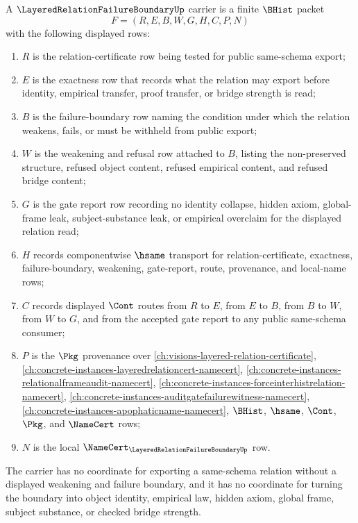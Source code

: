 \begin{definition}
\label{def:layered-relation-failure-boundary-carrier}
A $\LayeredRelationFailureBoundaryUp$ carrier is a finite $\BHist$ packet
$$
F=(R,E,B,W,G,H,C,P,N)
$$
with the following displayed rows:
\begin{enumerate}
\item $R$ is the relation-certificate row being tested for public same-schema export;
\item $E$ is the exactness row that records what the relation may export before identity, empirical transfer, proof transfer, or bridge strength is read;
\item $B$ is the failure-boundary row naming the condition under which the relation weakens, fails, or must be withheld from public export;
\item $W$ is the weakening and refusal row attached to $B$, listing the non-preserved structure, refused object content, refused empirical content, and refused bridge content;
\item $G$ is the gate report row recording no identity collapse, hidden axiom, global-frame leak, subject-substance leak, or empirical overclaim for the displayed relation read;
\item $H$ records componentwise $\hsame$ transport for relation-certificate, exactness, failure-boundary, weakening, gate-report, route, provenance, and local-name rows;
\item $C$ records displayed $\Cont$ routes from $R$ to $E$, from $E$ to $B$, from $B$ to $W$, from $W$ to $G$, and from the accepted gate report to any public same-schema consumer;
\item $P$ is the $\Pkg$ provenance over \autoref{ch:visions-layered-relation-certificate}, \autoref{ch:concrete-instances-layeredrelationcert-namecert}, \autoref{ch:concrete-instances-relationalframeaudit-namecert}, \autoref{ch:concrete-instances-forceinterhistrelation-namecert}, \autoref{ch:concrete-instances-auditgatefailurewitness-namecert}, \autoref{ch:concrete-instances-apophaticname-namecert}, $\BHist$, $\hsame$, $\Cont$, $\Pkg$, and $\NameCert$ rows;
\item $N$ is the local $\NameCert_{\LayeredRelationFailureBoundaryUp}$ row.
\end{enumerate}
The carrier has no coordinate for exporting a same-schema relation without a displayed weakening and failure boundary, and it has no coordinate for turning the boundary into object identity, empirical law, hidden axiom, global frame, subject substance, or checked bridge strength.
\end{definition}

